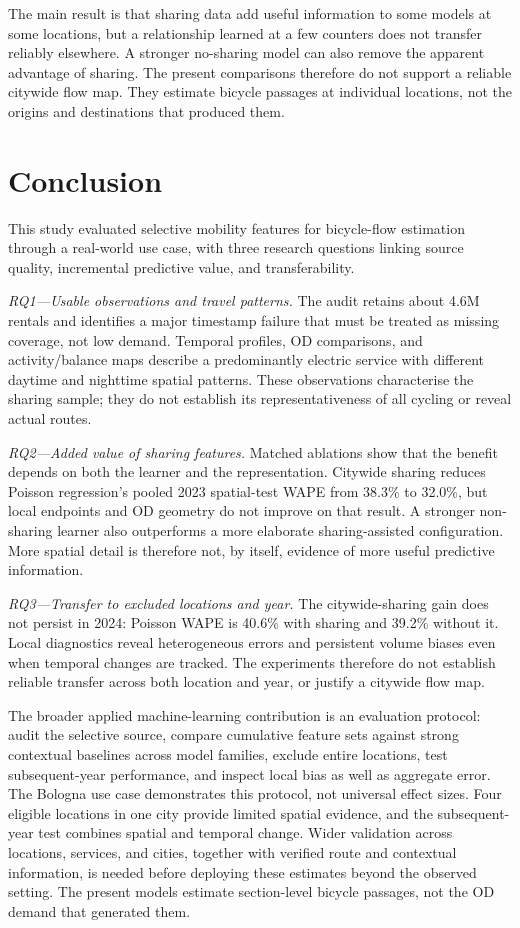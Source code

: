 \documentclass{interact}
\begin{document}
The main result is that sharing data add useful information to some models at some locations, but a relationship learned at a few counters does not transfer reliably elsewhere. A stronger no-sharing model can also remove the apparent advantage of sharing. The present comparisons therefore do not support a reliable citywide flow map. They estimate bicycle passages at individual locations, not the origins and destinations that produced them.

\section{Conclusion}
\label{sec:conclusion}
This study evaluated selective mobility features for bicycle-flow estimation through a real-world use case, with three research questions linking source quality, incremental predictive value, and transferability.

\emph{RQ1---Usable observations and travel patterns.} The audit retains about 4.6M rentals and identifies a major timestamp failure that must be treated as missing coverage, not low demand. Temporal profiles, OD comparisons, and activity/balance maps describe a predominantly electric service with different daytime and nighttime spatial patterns. These observations characterise the sharing sample; they do not establish its representativeness of all cycling or reveal actual routes.

\emph{RQ2---Added value of sharing features.} Matched ablations show that the benefit depends on both the learner and the representation. Citywide sharing reduces Poisson regression's pooled 2023 spatial-test WAPE from 38.3\%{} to 32.0\%{}, but local endpoints and OD geometry do not improve on that result. A stronger non-sharing learner also outperforms a more elaborate sharing-assisted configuration. More spatial detail is therefore not, by itself, evidence of more useful predictive information.

\emph{RQ3---Transfer to excluded locations and year.} The citywide-sharing gain does not persist in 2024: Poisson WAPE is 40.6\%{} with sharing and 39.2\%{} without it. Local diagnostics reveal heterogeneous errors and persistent volume biases even when temporal changes are tracked. The experiments therefore do not establish reliable transfer across both location and year, or justify a citywide flow map.

The broader applied machine-learning contribution is an evaluation protocol: audit the selective source, compare cumulative feature sets against strong contextual baselines across model families, exclude entire locations, test subsequent-year performance, and inspect local bias as well as aggregate error. The Bologna use case demonstrates this protocol, not universal effect sizes. Four eligible locations in one city provide limited spatial evidence, and the subsequent-year test combines spatial and temporal change. Wider validation across locations, services, and cities, together with verified route and contextual information, is needed before deploying these estimates beyond the observed setting. The present models estimate section-level bicycle passages, not the OD demand that generated them.
\end{document}
